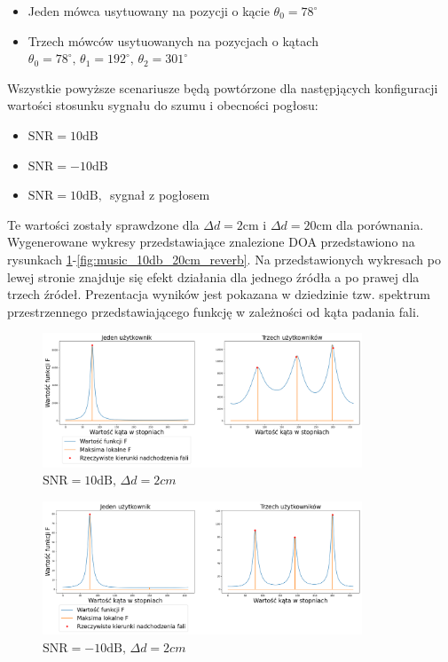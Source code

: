 \begin{itemize}
    \item Jeden mówca usytuowany na pozycji o kącie $\theta_{0} = 78^{\circ}$
    \item Trzech mówców usytuowanych na pozycjach o kątach $\theta_{0} = 78^{\circ}, \, \theta_{1} = 192^{\circ}, \, \theta_{2} = 301^{\circ}$
\end{itemize}
\noindent Wszystkie powyższe scenariusze będą powtórzone dla następjących konfiguracji wartości stosunku sygnału do szumu i obecności pogłosu:

\begin{itemize}
    \item $\mathrm{SNR}=10\mathrm{dB}$ 
    \item $\mathrm{SNR}=-10\mathrm{dB}$
    \item $\mathrm{SNR}=10\mathrm{dB}, \, $ sygnał z pogłosem
\end{itemize}

\noindent Te wartości zostały sprawdzone dla $\Delta d = 2$cm i $\Delta d = 20$cm dla porównania. Wygenerowane wykresy przedstawiające znalezione DOA przedstawiono na rysunkach \ref{fig:music_10db_2cm}-\ref{fig:music_10db_20cm_reverb}. Na przedstawionych wykresach po lewej stronie znajduje się efekt działania dla jednego źródła a po prawej dla trzech źródeł. Prezentacja wyników jest pokazana w dziedzinie tzw. spektrum przestrzennego przedstawiającego funkcję w zależności od kąta padania fali.

\begin{figure}[H]
    \centering
    \includegraphics[width=0.85\textwidth]{Images/music_10db.png}
    \caption{$\mathrm{SNR}=10\mathrm{dB}, \, \Delta d = 2cm$}
    \label{fig:music_10db_2cm}
\end{figure}

\begin{figure}[H]
    \centering
    \includegraphics[width=0.85\textwidth]{Images/music_-10db.png}
    \caption{$\mathrm{SNR}=-10\mathrm{dB}, \, \Delta d = 2cm$}
    \label{fig:music_-10db_2cm}
\end{figure}

